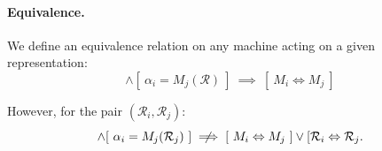 \documentclass{article}
\numberwithin{equation}{section}
\begin{document}
\paragraph{Equivalence.} 
We define an equivalence relation on any machine acting on a given representation:
\begin{equation}
[ \ M_i(\mathcal{R}) = \alpha_i \ ] \land [ \ \alpha_i = M_j(\mathcal{R}) \ ] \ \implies \ [ \ M_i \Leftrightarrow M_j \ ]
\end{equation}

However, for the pair $(\mathcal{R}_i, \mathcal{R}_j)$:
\begin{equation}
[ \ M_i(\mathcal{R}_i) = \alpha_i \ ] \land [ \ \alpha_i = M_j(\mathcal{R}_j) \ ] \centernot\implies [ \ M_i \Leftrightarrow M_j \ ] \lor [ \mathcal{R}_i \Leftrightarrow \mathcal{R}_j.
\end{equation}
\end{document}
